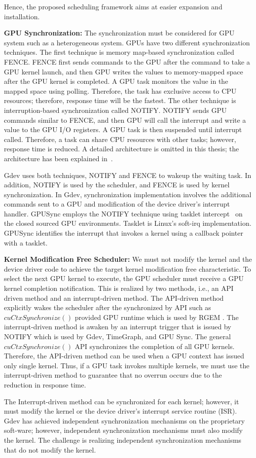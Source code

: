 Hence, the proposed scheduling framework aims at easier expansion and installation.

\textbf{GPU Synchronization:}
The synchronization must be considered for GPU system such as a heterogeneous system.
GPUs have two different synchronization techniques.
The first technique is memory map-based synchronization called FENCE.
FENCE first sends commands to the GPU after the command to take a GPU kernel launch,
and then GPU writes the values to memory-mapped space after the GPU kernel is completed.
A GPU task monitors the value in the mapped space using polling.
Therefore, the task has exclusive access to CPU resources; therefore, response time will be the fastest.
The other technique is interruption-based synchronization called NOTIFY.
NOTIFY sends GPU commands similar to FENCE,
and then GPU will call the interrupt and write a value to the GPU I/O registers.
A GPU task is then suspended until interrupt called.
Therefore, a task can share CPU resources with other tasks; however, response time is reduced.
A detailed architecture is omitted in this thesis;
the architecture has been explained in~\cite{kato:timegraph, kato:gdev, fujii:apsys2013}.

Gdev uses both techniques, NOTIFY and FENCE to wakeup the waiting task.
In addition, NOTIFY is used by the scheduler, and FENCE is used by kernel synchronization.
In Gdev, synchronization implementation involves the additional commands sent to a GPU and modification of the device driver’s interrupt handler.
GPUSync employs the NOTIFY technique using tasklet intercept~\cite{elliott2012robust} on the closed sourced GPU environments.
Tasklet is Linux's soft-irq implementation.
GPUSync identifies the interrupt that invokes a kernel using a callback pointer with a tasklet.

\textbf{Kernel Modification Free Scheduler:}
We must not modify the kernel and the device driver code to achieve the target kernel modification free characteristic.
To select the next GPU kernel to execute, the GPU scheduler must receive a GPU kernel completion notification.
This is realized by two methods, i.e., an API driven method and an interrupt-driven method.
The API-driven method explicitly wakes the scheduler after the synchronized by API such as $cuCtxSynchronize()$ provided GPU runtime which is used by RGEM\cite{kato:rgem} .
The interrupt-driven method is awaken by an interrupt trigger that is issued by NOTIFY which is used by Gdev, TimeGraph, and GPU Sync.
The general $cuCtxSynchronize()$ API synchronizes the completion of all GPU kernels.
Therefore, the API-driven method can be used when a GPU context has issued only single kernel.
Thus, if a GPU task invokes multiple kernels, we must use the interrupt-driven method to guarantee that no overrun occurs due to the reduction in response time.

The Interrupt-driven method can be synchronized for each kernel; however, it must modify the kernel or the device driver’s interrupt service routine (ISR).
Gdev has achieved independent synchronization mechanisms on the proprietary soft-ware;
however, independent synchronization mechanisms must also modify the kernel.
The challenge is realizing independent synchronization mechanisms that do not modify the kernel.
